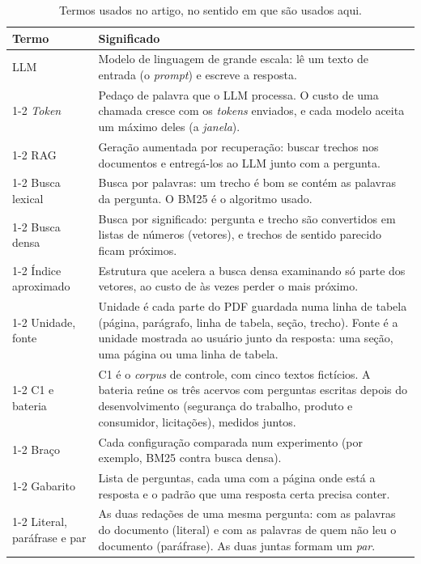 \documentclass[12pt]{article}
\begin{document}
\begin{table}[!htbp]
\centering
\caption{Termos usados no artigo, no sentido em que são usados aqui.}
\label{tab:glossario}
\small
\begin{tabular}{p{3.3cm}p{10.2cm}}
\toprule
Termo & Significado \\
\midrule
LLM & Modelo de linguagem de grande escala: lê um texto de entrada (o \emph{prompt}) e escreve a resposta. \\
\cmidrule(lr){1-2}
\emph{Token} & Pedaço de palavra que o LLM processa. O custo de uma chamada cresce com os \emph{tokens} enviados, e cada modelo aceita um máximo deles (a \emph{janela}). \\
\cmidrule(lr){1-2}
RAG & Geração aumentada por recuperação: buscar trechos nos documentos e entregá-los ao LLM junto com a pergunta. \\
\cmidrule(lr){1-2}
Busca lexical & Busca por palavras: um trecho é bom se contém as palavras da pergunta. O BM25 é o algoritmo usado. \\
\cmidrule(lr){1-2}
Busca densa & Busca por significado: pergunta e trecho são convertidos em listas de números (vetores), e trechos de sentido parecido ficam próximos. \\
\cmidrule(lr){1-2}
Índice aproximado & Estrutura que acelera a busca densa examinando só parte dos vetores, ao custo de às vezes perder o mais próximo. \\
\cmidrule(lr){1-2}
Unidade, fonte & Unidade é cada parte do PDF guardada numa linha de tabela (página, parágrafo, linha de tabela, seção, trecho). Fonte é a unidade mostrada ao usuário junto da resposta: uma seção, uma página ou uma linha de tabela. \\
\cmidrule(lr){1-2}
C1 e bateria & C1 é o \emph{corpus} de controle, com cinco textos fictícios. A bateria reúne os três acervos com perguntas escritas depois do desenvolvimento (segurança do trabalho, produto e consumidor, licitações), medidos juntos. \\
\cmidrule(lr){1-2}
Braço & Cada configuração comparada num experimento (por exemplo, BM25 contra busca densa). \\
\cmidrule(lr){1-2}
Gabarito & Lista de perguntas, cada uma com a página onde está a resposta e o padrão que uma resposta certa precisa conter. \\
\cmidrule(lr){1-2}
Literal, paráfrase e par & As duas redações de uma mesma pergunta: com as palavras do documento (literal) e com as palavras de quem não leu o documento (paráfrase). As duas juntas formam um \emph{par}. \\

\end{tabular}
\end{table}
\end{document}
